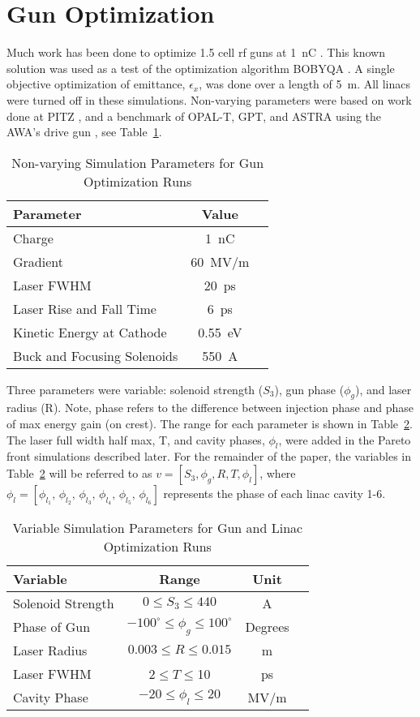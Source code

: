 \documentclass[letterpaper,  %
              ]{jacow}
\begin{document}
\section{Gun Optimization}
Much work has been done to optimize 1.5 cell rf guns
at \SI{1}{nC} \cite{pitz}. This known solution was used as a test 
of the optimization algorithm BOBYQA \cite{bobyqa}. 
A single objective optimization of emittance, $\epsilon_x$, was 
done over a length of \SI{5}{m}. All linacs were turned off in these simulations. 
Non-varying parameters were based on work done at 
PITZ \cite{pitz}, and a benchmark of OPAL-T, GPT, and ASTRA 
using the AWA's drive gun \cite{benchmark}, see Table~\ref{tab:gun}.
\begin{table}[hbt] %
	\centering
	\begin{tabular}{l c c}
		\textbf{Parameter} & \textbf{Value} \\
		\hline %
		Charge  & \SI{1}{nC} \\
		Gradient & \SI{60}{MV/m} \\
		Laser FWHM & \SI{20}{ps} \\
		Laser Rise and Fall Time & \SI{6}{ps} \\
		Kinetic Energy at Cathode  & \SI{0.55}{eV} \\
		Buck and Focusing Solenoids & \SI{550}{A}
	\end{tabular}
	\caption{Non-varying Simulation Parameters for Gun Optimization Runs}
	\label{tab:gun}
\end{table}
Three parameters were variable: solenoid strength ($S_3$), gun phase
($\phi_g$), and laser radius (R). Note, phase 
refers to the difference between injection phase and 
phase of max energy gain (on crest). The range for each 
parameter is shown in Table~\ref{tab:parameters}. 
The laser full width half max, T, and cavity phases, $\phi_l$, were added in the 
Pareto front simulations described later. For the 
remainder of the paper, the variables in Table~\ref{tab:parameters} 
will be referred to as $v=\left[S_3, \phi_g, R, T, \phi_l\right]$, where 
$\phi_l=[\phi_{l_1},\,\phi_{l_2},\,\phi_{l_3},\,\phi_{l_4},\,\phi_{l_5},\,\phi_{l_6}]$
represents the phase of each linac cavity 1-6. 
\begin{table}[hbt] %
	\centering
	\begin{tabular}{ l *{3}{c}}
		\textbf{Variable} & \textbf{Range} & \textbf{Unit} \\
		\hline %
		Solenoid Strength & $ 0 \le S_3 \le 440$  & A \\
		Phase of Gun & $-100^\circ \le \phi_g \le 100^\circ$  & Degrees \\
		Laser Radius & $0.003 \le R \le 0.015$  & m \\
		Laser FWHM & $2 \le T \le $10  & ps \\
		Cavity Phase & $-20 \le \phi_l \le 20$  & MV/m \\
	\end{tabular}
	\caption{Variable Simulation Parameters for Gun and Linac Optimization Runs}	
	\label{tab:parameters}
\end{table}
\end{document}
